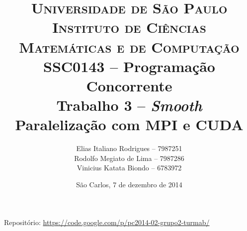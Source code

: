 \begin{titlepage}

		\title{
\textsc {\large{Universidade de São Paulo\\
Instituto de Ciências Matemáticas e de Computação}}\\[1cm]
\large{SSC0143 -- Programação Concorrente}\\[5cm]
\LARGE{Trabalho 3 -- \textit{Smooth}}\\[0.5cm]
Paralelização com MPI e CUDA\\[4cm]
		}

		\author{
Elias Italiano Rodrigues -- 7987251\\
Rodolfo Megiato de Lima -- 7987286\\
Vinicius Katata Biondo -- 6783972
		}

		\date{
\vfill São Carlos, 7 de dezembro de 2014
		}

		\maketitle
Repositório: \url{https://code.google.com/p/pc2014-02-grupo2-turmab/}
		\thispagestyle{empty}

\end{titlepage}

